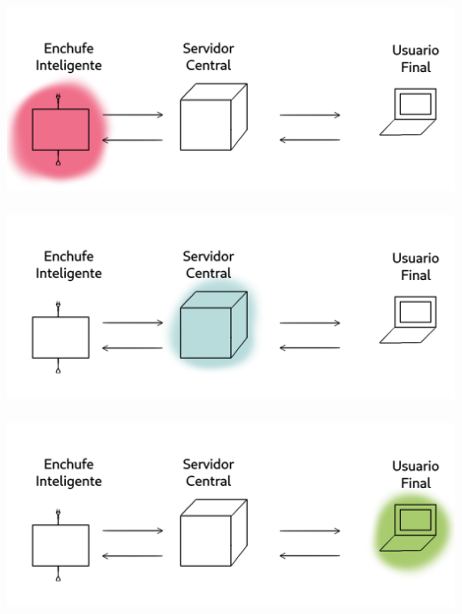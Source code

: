 \documentclass[compress, aspectratio=169]{beamer} %
\begin{document}
\begin{frame}
  \transdissolve[duration=1]
  \frametitle{\insertsubsection}
  \includegraphics{img/esquema_basico_sistema_enchufe_resaltado.png}
\end{frame}

\begin{frame}
  \transdissolve[duration=1]
  \frametitle{\insertsubsection}
  \includegraphics{img/esquema_basico_sistema_servidor_resaltado.png}
\end{frame}

\begin{frame}
  \transdissolve[duration=1]
  \frametitle{\insertsubsection}
  \includegraphics{img/esquema_basico_sistema_app_resaltado.png}
\end{frame}
\end{document}
